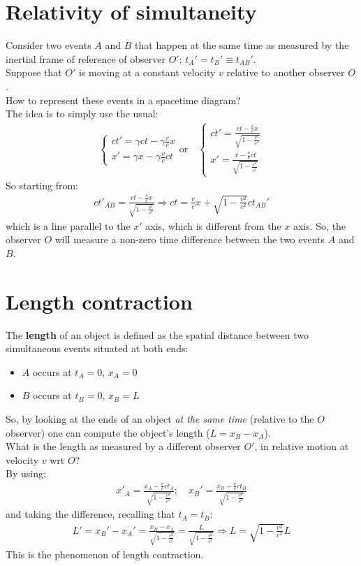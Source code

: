 \documentclass[../template.tex]{subfiles}
\begin{document}
\section{Relativity of simultaneity}
Consider two events $A$ and $B$ that happen at the same time as measured by the inertial frame of reference of observer $O'$: $t_A' = t_B' \equiv t_{AB}'$.\\
Suppose that $O'$ is moving at a constant velocity $v$ relative to another observer $O$.\\
How to represent these events in a spacetime diagram?\\
The idea is to simply use the usual:
\begin{align*}
\begin{cases}
ct' =\gamma c t-\gamma \frac{v}{c}x\\
x' = \gamma x - \gamma \frac{v}{c}ct
\end{cases} \text{or} \quad  \begin{cases}
ct' = \frac{ct - \frac{v}{c}x}{\sqrt{1-\frac{v^2}{c^2}}}\\
x' = \frac{x-\frac{v}{c}ct}{\sqrt{1-\frac{v^2}{c^2}}}
\end{cases}
\end{align*}
So starting from:
\begin{align*}
ct'_{AB} = \frac{ct - \frac{v}{c}x}{\sqrt{1-\frac{v^2}{c^2}}} \Rightarrow ct = \frac{v}{c}x + \sqrt{1-\frac{v^2}{c^2}}ct_{AB}'
\end{align*}
which is a line parallel to the $x'$ axis, which is different from the $x$ axis. So, the observer $O$ will measure a non-zero time difference between the two events $A$ and $B$.

\section{Length contraction}
The \textbf{length} of an object is defined as the spatial distance between two simultaneous events situated at both ends:
\begin{itemize}
\item $A$ occurs at $t_A=0$, $x_A=0$
\item $B$ occurs at $t_B=0$, $x_B=L$
\end{itemize}
So, by looking at the ends of an object \textit{at the same time} (relative to the $O$ observer) one can compute the object's length ($L=x_B-x_A$).\\
What is the length as measured by a different observer $O'$, in relative motion at velocity $v$ wrt $O$?\\
By using:
\begin{align*}
x'_A = \frac{x_A - \frac{v}{c}ct_A}{\sqrt{1-\frac{v^2}{c^2}}}; \quad x_B' = \frac{x_B - \frac{v}{c}ct_B}{\sqrt{1-\frac{v^2}{c^2}}}
\end{align*}
and taking the difference, recalling that $t_A = t_B$:
\begin{align*}
L'=x_B' - x_A' = \frac{x_B - x_A}{\sqrt{1-\frac{v^2}{c^2}}} = \frac{L}{\sqrt{1-\frac{v^2}{c^2}}} \Rightarrow L = \sqrt{1-\frac{v^2}{c^2}}L
\end{align*}
This is the phenomenon of length contraction.
\end{document}
